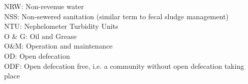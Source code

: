 \documentclass{article}
\begin{document}
NRW:  Non-revenue water
\vspace{0.3cm}\\
NSS:  Non-sewered sanitation (similar term to fecal sludge management)
\vspace{0.3cm}\\
NTU:  Nephelometer Turbidity Units
\vspace{0.3cm}\\
O \& G:  Oil and Grease
\vspace{0.3cm}\\
O\&M:  Operation and maintenance
\vspace{0.3cm}\\
OD:  Open defecation
\vspace{0.3cm}\\
ODF:  Open defecation free, i.e. a community without open defecation taking place
\vspace{0.3cm}\\
\end{document}
